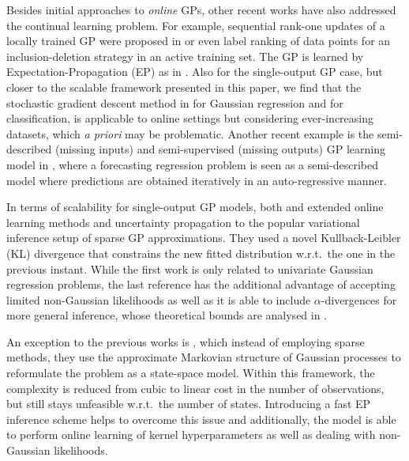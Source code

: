 \documentclass[]{article}
\begin{document}
Besides initial approaches to \emph{online} GPs, other recent works have also addressed the continual learning problem. For example, sequential rank-one updates of a locally trained GP were proposed in \citet{nguyen2008local} or even label ranking of data points for an inclusion-deletion strategy in an active training set. The GP is learned by Expectation-Propagation (EP) as in \citet{henao2010pass}. Also for the single-output GP case, but closer to the scalable framework presented in this paper, 
we find that the stochastic gradient descent method in \citet{hensman2013gaussian} for Gaussian regression and \citet{hensman2015scalable} for classification, is applicable to online settings but considering ever-increasing datasets, which \emph{a priori} may be problematic. Another recent example is the semi-described (missing inputs) and semi-supervised (missing outputs) GP learning model in \citet{damianou2015semi}, where a forecasting regression problem is seen as a semi-described model where predictions are obtained iteratively in an auto-regressive manner.

In terms of scalability for single-output GP models, both \citet{cheng2016incremental} and \citet{bui2017streaming} extended online learning methods and uncertainty propagation to the popular variational inference setup of sparse GP approximations. They used a novel Kullback-Leibler (KL) divergence  that constrains the new fitted distribution w.r.t.\ the one in the previous instant. While the first work is only related to univariate Gaussian regression problems, the last reference has the additional advantage of accepting limited non-Gaussian likelihoods as well as it is able to include $\alpha$-divergences for more general inference, whose theoretical bounds are analysed in \citet{nguyen2017online}. 

An exception to the previous works is \citet{solin2018infinite}, which instead of employing sparse methods, they use the approximate Markovian structure of Gaussian processes to reformulate the problem as a state-space model. Within this framework, the complexity is reduced from cubic to linear cost in the number of observations, but still stays unfeasible w.r.t.\ the number of states. Introducing a fast EP inference scheme helps to overcome this issue and additionally, the model is able to perform online learning of kernel hyperparameters as well as dealing with non-Gaussian likelihoods. 
\end{document}
